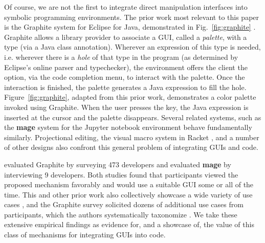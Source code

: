 Of course, we are not the first to integrate direct manipulation interfaces
into symbolic programming environments.
The prior work most relevant to this paper is the {Graphite} system for Eclipse for Java,
demonstrated in Fig.~\ref{fig:graphite} \cite{Graphite}.
Graphite allows a library provider to associate a GUI, called a \emph{palette}, with a type 
(via a Java class annotation).
Wherever an expression of this type is needed,
i.e. wherever there is a \emph{hole} of that type in the program
(as determined by Eclipse's online parser and typechecker),
the environment offers the client the option, via the code completion menu,
to interact with the palette.
Once the interaction is finished, the palette generates a
Java expression to fill the hole.
Figure~\ref{fig:graphite}, adapted from this prior work, demonstrates a color palette invoked using Graphite.
When the user presses the  key, the Java expression  is inserted at the cursor and the palette disappears.
Several related systems, such as the  
\textbf{mage} system for the Jupyter notebook environment \cite{DBLP:conf/uist/KeryRHMWP20}
behave fundamentally similarly.
Projectional editing, the visual macro system in Racket \cite{interactive-visual-syntax}, and a number of other designs
also confront this general problem of integrating GUIs and code.

\newpage
\citet{Graphite} evaluated Graphite by surveying 473 developers 
and \citet{DBLP:conf/uist/KeryRHMWP20} evaluated \textbf{mage} by interviewing 9 developers.
Both studies found that
participants viewed the proposed mechanism favorably and 
would use a suitable GUI some or all of the time.
This and other prior work also collectively showcase a wide variety of use cases \cite{Graphite,DBLP:conf/uist/KeryRHMWP20,interactive-visual-syntax}, 
and the Graphite survey solicited dozens of additional use cases from participants,
which the authors systematically taxonomize \cite{Graphite}. 
We take these extensive empirical findings   
as evidence for, and a showcase of, 
the value of this class of mechanisms for integrating GUIs into code.
\vspace{-1mm}
